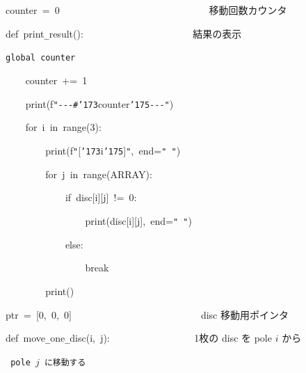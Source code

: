 \documentclass{article}
\begin{document}
\noindent
\mbox{}\hfill

\noindent
\mbox{}counter{\tt\mc \ }={\tt\mc \ }0{\tt\mc \ \ \ \ \ \ \ \ \ \ \ \ \ \ \ \ \ \ \ \ \ \ \ \ \ \ \ \ \ }\rm\mc {\tt\#}\  {}移動回数カウンタ \hfill  \rm\mc 

\noindent
\mbox{}\tt\mc \hfill

\noindent
\mbox{}def{\tt\mc \ }print{\tt\_}result():{\tt\mc \ \ \ \ \ \ \ \ \ \ \ \ \ \ \ \ \ \ \ \ \ }\rm\mc {\tt\#}\  {}結果の表示 \hfill  \rm\mc 

\noindent
\mbox{}\tt\mc {\tt\mc \ \ \ \ }global{\tt\mc \ }counter

\noindent
\mbox{}{\tt\mc \ \ \ \ }counter{\tt\mc \ }+={\tt\mc \ }1

\noindent
\mbox{}{\tt\mc \ \ \ \ }print(f{\tt "}{\tt -}{\tt -}{\tt -}{\tt\#}{\tt\char'173}counter{\tt\char'175}{\tt -}{\tt -}{\tt -}{\tt "})

\noindent
\mbox{}{\tt\mc \ \ \ \ }for{\tt\mc \ }i{\tt\mc \ }in{\tt\mc \ }range(3):

\noindent
\mbox{}{\tt\mc \ \ \ \ \ \ \ \ }print(f{\tt "}[{\tt\char'173}i{\tt\char'175}]{\tt "},{\tt\mc \ }end={\tt "}{\tt\mc \ }{\tt "})

\noindent
\mbox{}{\tt\mc \ \ \ \ \ \ \ \ }for{\tt\mc \ }j{\tt\mc \ }in{\tt\mc \ }range(ARRAY):

\noindent
\mbox{}{\tt\mc \ \ \ \ \ \ \ \ \ \ \ \ }if{\tt\mc \ }disc[i][j]{\tt\mc \ }!={\tt\mc \ }0:

\noindent
\mbox{}{\tt\mc \ \ \ \ \ \ \ \ \ \ \ \ \ \ \ \ }print(disc[i][j],{\tt\mc \ }end={\tt "}{\tt\mc \ }{\tt "})

\noindent
\mbox{}{\tt\mc \ \ \ \ \ \ \ \ \ \ \ \ }else:

\noindent
\mbox{}{\tt\mc \ \ \ \ \ \ \ \ \ \ \ \ \ \ \ \ }break

\noindent
\mbox{}{\tt\mc \ \ \ \ \ \ \ \ }print()

\noindent
\mbox{}\hfill

\noindent
\mbox{}ptr{\tt\mc \ }={\tt\mc \ }[0,{\tt\mc \ }0,{\tt\mc \ }0]{\tt\mc \ \ \ \ \ \ \ \ \ \ \ \ \ \ \ \ \ \ \ \ \ \ \ \ \ }\rm\mc {\tt\#}\  {}disc 移動用ポインタ \hfill  \rm\mc 

\noindent
\mbox{}\tt\mc \hfill

\noindent
\mbox{}def{\tt\mc \ }move{\tt\_}one{\tt\_}disc(i,{\tt\mc \ }j):{\tt\mc \ \ \ \ \ \ \ \ \ \ \ \ \ \ \ \ }\rm\mc {\tt\#}\  {}1枚の disc を pole $i$ から \hfill  \rm\mc 

\noindent
\mbox{}\tt\mc {\tt\mc \ \ \ \ \ \ \ \ \ \ \ \ \ \ \ \ \ \ \ \ \ \ \ \ \ \ \ \ \ \ \ \ \ \ \ \ \ \ \ \ }\rm\mc {\tt\#}\  {}pole $j$ に移動する \hfill  \rm\mc 
\end{document}
